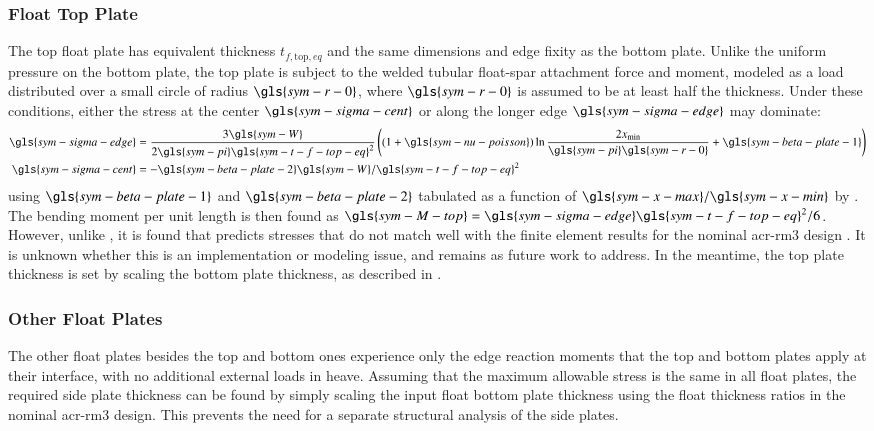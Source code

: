 \subsubsection{Float Top Plate}
The top float plate has equivalent thickness $t_{f,\text{top},eq}$ and the same dimensions and edge fixity as the bottom plate.
Unlike the uniform pressure on the bottom plate, the top plate is subject to the welded tubular float-spar attachment force and moment, modeled as a load distributed over a small circle of radius $\gls{sym-r-0}$, where $\gls{sym-r-0}$ is assumed to be at least half the thickness.
Under these conditions, either the stress at the center $\gls{sym-sigma-cent}$ or along the longer edge $\gls{sym-sigma-edge}$ may dominate:
\begin{equation}\label{eq:top-plate-stress}
    \begin{aligned}
    \gls{sym-sigma-edge}&= \frac{3\gls{sym-W}}{2\gls{sym-pi} \gls{sym-t-f-top-eq}^2}\left( (1+\gls{sym-nu-poisson})\ln\frac{2x_{\text{min}}}{\gls{sym-pi} \gls{sym-r-0}}+\gls{sym-beta-plate-1}\right)\\
        \gls{sym-sigma-cent}&=-\gls{sym-beta-plate-2} \gls{sym-W}/\gls{sym-t-f-top-eq}^2
    \end{aligned}
\end{equation}
using $\gls{sym-beta-plate-1}$ and $\gls{sym-beta-plate-2}$ tabulated as a function of $\gls{sym-x-max}/\gls{sym-x-min}$ by \citet{young_roarks_2001}.
The bending moment per unit length is then found as $\gls{sym-M-top}=\gls{sym-sigma-edge} \gls{sym-t-f-top-eq}^2/6$.
However, unlike , it is found that  predicts stresses that do not match well with the finite element results for the nominal \gls{acr-rm3} design \citep{RM3,previsic_reference_2011}.
It is unknown whether this is an implementation or modeling issue, and remains as future work to address.
In the meantime, the top plate thickness is set by scaling the bottom plate thickness, as described in .

\subsubsection{Other Float Plates}
The other float plates besides the top and bottom ones experience only the edge reaction moments that the top and bottom plates apply at their interface, with no additional external loads in heave.
Assuming that the maximum allowable stress is the same in all float plates, the required side plate thickness can be found by simply scaling the input float bottom plate thickness using the float thickness ratios in the nominal \gls{acr-rm3} design.
This prevents the need for a separate structural analysis of the side plates.

